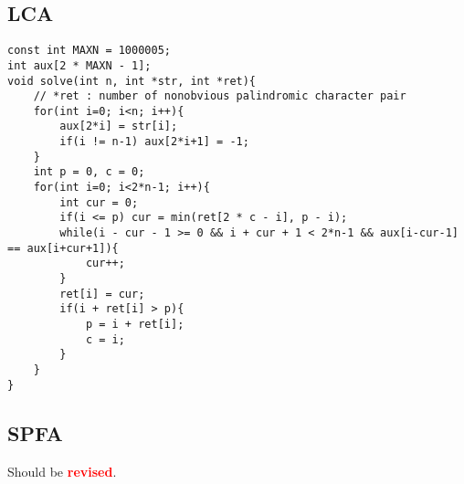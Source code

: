 \documentclass[landscape, 8pt, a4paper, oneside, twocolumn]{extarticle}
\newcommand{\revised}{Should be \textcolor{red}{\textbf{revised}}.}
\begin{document}
\subsection{LCA}
\begin{verbatim}
const int MAXN = 1000005;
int aux[2 * MAXN - 1];
void solve(int n, int *str, int *ret){
	// *ret : number of nonobvious palindromic character pair
	for(int i=0; i<n; i++){
		aux[2*i] = str[i];
		if(i != n-1) aux[2*i+1] = -1;
	}
	int p = 0, c = 0;
	for(int i=0; i<2*n-1; i++){
		int cur = 0;
		if(i <= p) cur = min(ret[2 * c - i], p - i);
		while(i - cur - 1 >= 0 && i + cur + 1 < 2*n-1 && aux[i-cur-1] == aux[i+cur+1]){
			cur++;
		}
		ret[i] = cur;
		if(i + ret[i] > p){
			p = i + ret[i];
			c = i;
		}
	}
}
\end{verbatim}

\subsection{SPFA}
\revised
\end{document}
